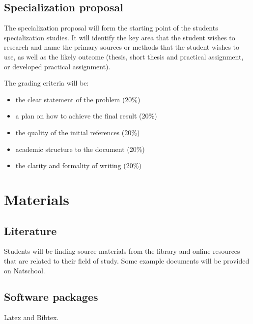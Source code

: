 \documentclass{article}
\begin{document}
\subsection{Specialization proposal}
The specialization proposal will form the starting point of the students specialization studies. It will identify the key area that the student wishes to research and name the primary sources or methods that the student wishes to use, as well as the likely outcome (thesis, short thesis and practical assignment, or developed practical assignment).

The grading criteria will be:
\begin{itemize}
\item the clear statement of the problem (20\%)
\item a plan on how to achieve the final result (20\%)
\item the quality of the initial references (20\%)
\item academic structure to the document (20\%)
\item the clarity and formality of writing (20\%)
\end{itemize}


\section{Materials}
\subsection{Literature}
Students will be finding source materials from the library and online resources that are related to their field of study. Some example documents will be provided on Natschool.


\subsection{Software packages}
Latex and Bibtex.
\end{document}
